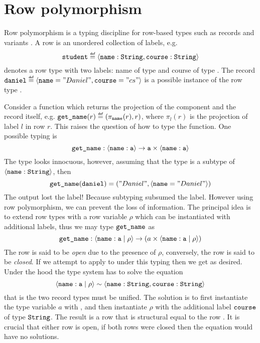 \section{Row polymorphism}\label{sec:rowpolymorphism}
Row polymorphism is a typing discipline for row-based types such as records and variants \cite{Remy1993}. A row is an unordered collection of labels, e.g. 
\[ \type{student} \defas \record{\code{name}:\type{String},\code{course}:\type{String}} \]
denotes a row type with two labels: name of type  and course of type . The record $\code{daniel} \defas \record{\code{name}="Daniel", \code{course}="cs"}$ is a possible instance of the row type . 

Consider a function which returns the projection of the  component and the record itself, e.g. $\code{get\_name}(r) \defas (\pi_{\code{name}}(r), r)$, where $\pi_l(r)$ is the projection of label $l$ in row $r$. This raises the question of how to type the function. One possible typing is 
\[ \texttt{get\_name} : \langle \texttt{name}:\texttt{a} \rangle \to \texttt{a} \times \langle \texttt{name}:\texttt{a} \rangle \]
The type looks innocuous, however, assuming that the type  is a subtype of $\langle \texttt{name}:\texttt{String} \rangle$, then 
\[
  \texttt{get\_name}(\texttt{daniel}) = ("Daniel", \langle \texttt{name}="Daniel" \rangle)
\]
The output lost the  label! Because subtyping subsumed the label. However using row polymorphism, we can prevent the loss of information.
The principal idea is to extend row types with a row variable $\rho$ which can be instantiated with additional labels, thus we may type $\texttt{get\_name}$ as
\[ \texttt{get\_name} : \langle \texttt{name}:\texttt{a} \; | \; \rho \rangle \to (a \times \langle \texttt{name}:\texttt{a} \; | \; \rho \rangle) \]
The row  is said to be \emph{open} due to the presence of $\rho$, conversely, the row  is said to be \emph{closed}. If we attempt to apply  to  under this typing then we get  as desired. Under the hood the type system has to solve the equation 
\[ 
\langle \texttt{name}:\texttt{a} \; | \; \rho \rangle \sim \langle \texttt{name}:\texttt{String},\texttt{course}:\texttt{String} \rangle
\]
that is the two record types must be unified. The solution is to first instantiate the type variable $a$ with , and then instantiate $\rho$ with the additional label $\texttt{course}$ of type $\texttt{String}$. The result is a row that is structural equal to the row . It is crucial that either row is open, if both rows were closed then the equation would have no solutions.
